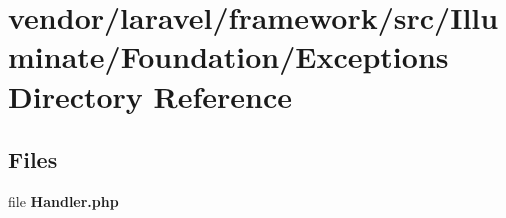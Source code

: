 \section{vendor/laravel/framework/src/\+Illuminate/\+Foundation/\+Exceptions Directory Reference}
\label{dir_b8d7dcb0860238277d6e3dfbb056fb01}
\subsection*{Files}
\begin{DoxyCompactItemize}
\item 
file {\bf Handler.\+php}
\end{DoxyCompactItemize}

